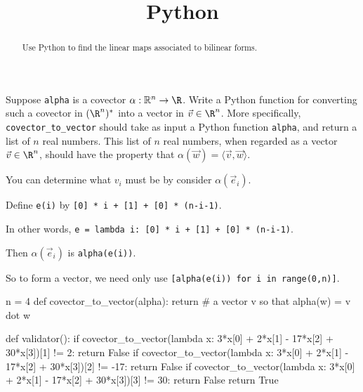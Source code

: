 \documentclass{ximera}
\title{Python}
\begin{document}
\begin{abstract}
  Use Python to find the linear maps associated to bilinear forms.
\end{abstract}\maketitle	

\begin{question}
  Suppose \texttt{alpha} is a covector $\alpha : \mathbb{R}^n \to \R$.  Write a Python function for converting such a covector in $(\R^n)^*$ into a vector in $\vec{v} \in \R^n$.  More specifically, \texttt{covector\_to\_vector} should take as input a Python function \texttt{alpha}, and return a list of $n$ real numbers.  This list of $n$ real numbers, when regarded as a vector $\vec{v} \in \R^n$, should have the property that $\alpha(\vec{w}) = \langle \vec{v}, \vec{w} \rangle$.

  \begin{solution}
    \begin{hint}
      You can determine what $v_i$ must be by consider $\alpha(\vec{e}_i)$.
    \end{hint}
    \begin{hint}
      Define \texttt{e(i)} by \texttt{[0] * i + [1] + [0] * (n-i-1)}.
    \end{hint}
    \begin{hint}
      In other words, \texttt{e = lambda i: [0] * i + [1] + [0] * (n-i-1)}.
    \end{hint}
    \begin{hint}
      Then $\alpha(\vec{e}_i)$ is \texttt{alpha(e(i))}.
    \end{hint}
    \begin{hint}
      So to form a vector, we need only use \texttt{[alpha(e(i)) for i in range(0,n)]}.
    \end{hint}
    \begin{python}
n = 4
def covector_to_vector(alpha):
  return # a vector v so that alpha(w) = v dot w

def validator():
  if covector_to_vector(lambda x: 3*x[0] + 2*x[1] - 17*x[2] + 30*x[3])[1] != 2:
    return False
  if covector_to_vector(lambda x: 3*x[0] + 2*x[1] - 17*x[2] + 30*x[3])[2] != -17:
    return False
  if covector_to_vector(lambda x: 3*x[0] + 2*x[1] - 17*x[2] + 30*x[3])[3] != 30:
    return False
  return True
    \end{python}
  \end{solution}


\end{question}
\end{document}
